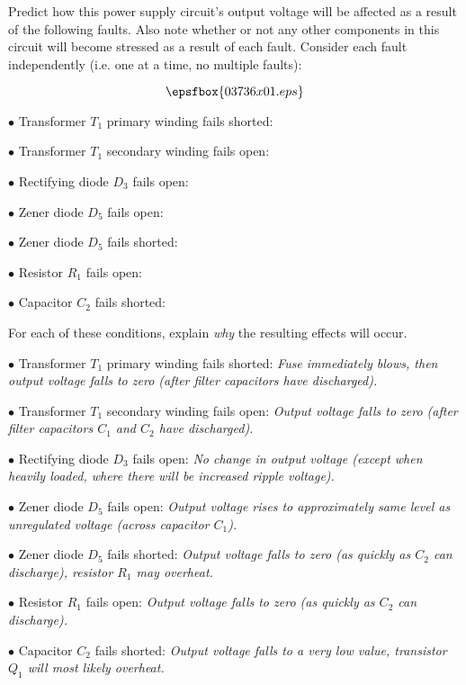 

Predict how this power supply circuit's output voltage will be affected as a result of the following faults.  Also note whether or not any other components in this circuit will become stressed as a result of each fault.  Consider each fault independently (i.e. one at a time, no multiple faults):

$$\epsfbox{03736x01.eps}$$

\medskip
\item{$\bullet$} Transformer $T_1$ primary winding fails shorted:
\vskip 5pt
\item{$\bullet$} Transformer $T_1$ secondary winding fails open:
\vskip 5pt
\item{$\bullet$} Rectifying diode $D_3$ fails open:
\vskip 5pt
\item{$\bullet$} Zener diode $D_5$ fails open:
\vskip 5pt
\item{$\bullet$} Zener diode $D_5$ fails shorted:
\vskip 5pt
\item{$\bullet$} Resistor $R_1$ fails open:
\vskip 5pt
\item{$\bullet$} Capacitor $C_2$ fails shorted:
\medskip

For each of these conditions, explain {\it why} the resulting effects will occur.







\medskip
\item{$\bullet$} Transformer $T_1$ primary winding fails shorted: {\it Fuse immediately blows, then output voltage falls to zero (after filter capacitors have discharged).}
\vskip 5pt
\item{$\bullet$} Transformer $T_1$ secondary winding fails open: {\it Output voltage falls to zero (after filter capacitors $C_1$ and $C_2$ have discharged).}
\vskip 5pt
\item{$\bullet$} Rectifying diode $D_3$ fails open: {\it No change in output voltage (except when heavily loaded, where there will be increased ripple voltage).}
\vskip 5pt
\item{$\bullet$} Zener diode $D_5$ fails open: {\it Output voltage rises to approximately same level as unregulated voltage (across capacitor $C_1$).}
\vskip 5pt
\item{$\bullet$} Zener diode $D_5$ fails shorted: {\it Output voltage falls to zero (as quickly as $C_2$ can discharge), resistor $R_1$ may overheat.}
\vskip 5pt
\item{$\bullet$} Resistor $R_1$ fails open: {\it Output voltage falls to zero (as quickly as $C_2$ can discharge).}
\vskip 5pt
\item{$\bullet$} Capacitor $C_2$ fails shorted: {\it Output voltage falls to a very low value, transistor $Q_1$ will most likely overheat.}
\medskip

